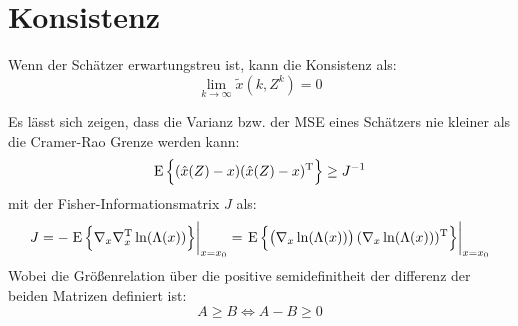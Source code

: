 \section{Konsistenz}
Wenn der Schätzer erwartungstreu ist, kann die Konsistenz als:
\begin{equation*}
    \lim_{k \to \infty} \tilde{x}(k, Z^k) = 0
\end{equation*}

Es lässt sich zeigen, dass die Varianz bzw. der MSE eines Schätzers nie kleiner als die Cramer-Rao Grenze werden kann:
\begin{equation*}
    \operatorname*{E}\left\{(\hat{x}(Z) - x) (\hat{x}(Z) - x)^\text{T}\right\} \geq J^{-1}
\end{equation*}
mit der Fisher-Informationsmatrix $J$ als:
\begin{equation*}
    J = -\left. \operatorname*{E}\left\{\nabla_x \nabla^\text{T}_x \ln(\Lambda(x))\right\} \right|_{x=x_0} 
        = \left. \operatorname*{E}\left\{\left(\nabla_x \ln(\Lambda(x))\right) (\nabla_x \ln(\Lambda(x)))^\text{T}\right\} \right|_{x=x_0}
\end{equation*}
Wobei die Größenrelation über die positive semidefinitheit der differenz der beiden Matrizen definiert ist:
\begin{equation*}
    A \geq B \Leftrightarrow A - B \geq 0
\end{equation*}
